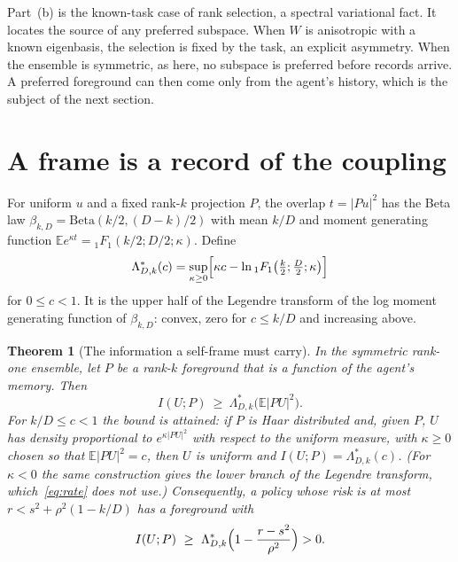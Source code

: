\documentclass[12pt]{article}
\newtheorem{theorem}{Theorem}
\theoremstyle{definition}
\newcommand{\E}{\mathbb E}
\begin{document}
Part~(b) is the known-task case of rank selection, a spectral variational fact. It locates the source of any preferred subspace. When $W$ is anisotropic with a known eigenbasis, the selection is fixed by the task, an explicit asymmetry. When the ensemble is symmetric, as here, no subspace is preferred before records arrive. A preferred foreground can then come only from the agent's history, which is the subject of the next section.

\section{A frame is a record of the coupling}
\label{sec:rate}

For uniform $u$ and a fixed rank-$k$ projection $P$, the overlap $t=|Pu|^2$ has the Beta law $\beta_{k,D}=\mathrm{Beta}(k/2,(D-k)/2)$ with mean $k/D$ and moment generating function $\E e^{\kappa t}={}_1F_1(k/2;D/2;\kappa)$. Define
\begin{equation}
\label{eq:Lstar}
\Lambda^*_{D,k}(c)=\sup_{\kappa\ge0}\Bigl[\kappa c-\ln{}_1F_1\bigl(\tfrac k2;\tfrac D2;\kappa\bigr)\Bigr]
\end{equation}
for $0\le c<1$. It is the upper half of the Legendre transform of the log moment generating function of $\beta_{k,D}$: convex, zero for $c\le k/D$ and increasing above.

\begin{theorem}[The information a self-frame must carry]
\label{thm:rate}
In the symmetric rank-one ensemble, let $P$ be a rank-$k$ foreground that is a function of the agent's memory. Then
\begin{equation}
\label{eq:rate}
I(U;P)\ \ge\ \Lambda^*_{D,k}\bigl(\E|PU|^2\bigr).
\end{equation}
For $k/D\le c<1$ the bound is attained: if $P$ is Haar distributed and, given $P$, $U$ has density proportional to $e^{\kappa|PU|^2}$ with respect to the uniform measure, with $\kappa\ge0$ chosen so that $\E|PU|^2=c$, then $U$ is uniform and $I(U;P)=\Lambda^*_{D,k}(c)$. (For $\kappa<0$ the same construction gives the lower branch of the Legendre transform, which~\eqref{eq:rate} does not use.) Consequently, a policy whose risk is at most $r<s^2+\rho^2(1-k/D)$ has a foreground with
\begin{equation}
\label{eq:rate_risk}
I(U;P)\ \ge\ \Lambda^*_{D,k}\Bigl(1-\frac{r-s^2}{\rho^2}\Bigr)>0 .
\end{equation}
\end{theorem}
\end{document}
